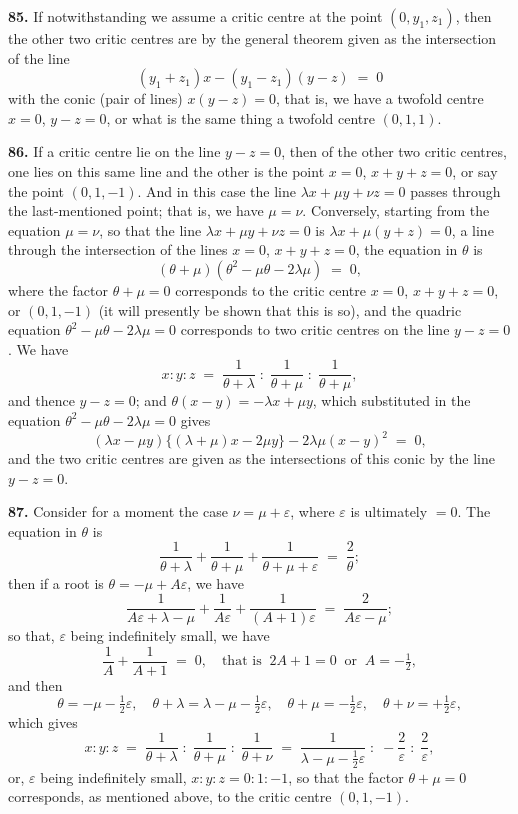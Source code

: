 \documentclass[11pt,a4paper]{article}
\begin{document}
\medskip

\textbf{85.} If notwithstanding we assume a critic centre at the point $(0,y_{1},z_{1})$, then the other two critic centres are by the general theorem given as the intersection of the line
\[
(y_{1}+z_{1})x - (y_{1}-z_{1})(y-z) \;=\; 0
\]
with the conic (pair of lines) $x(y-z) = 0$, that is, we have a twofold centre $x=0$, $y-z=0$, or what is the same thing a twofold centre $(0,1,1)$.

\medskip

\textbf{86.} If a critic centre lie on the line $y-z=0$, then of the other two critic centres, one lies on this same line and the other is the point $x=0$, $x+y+z=0$, or say the point $(0,1,-1)$. And in this case the line $\lambda x + \mu y + \nu z = 0$ passes through the last-mentioned point; that is, we have $\mu = \nu$. Conversely, starting from the equation $\mu = \nu$, so that the line $\lambda x + \mu y + \nu z = 0$ is $\lambda x + \mu(y+z) = 0$, a line through the intersection of the lines $x=0$, $x+y+z=0$, the equation in $\theta$ is
\[
(\theta + \mu)(\theta^{2}-\mu\theta-2\lambda\mu) \;=\; 0,
\]
where the factor $\theta + \mu = 0$ corresponds to the critic centre $x=0$, $x+y+z=0$, or $(0,1,-1)$ (it will presently be shown that this is so), and the quadric equation $\theta^{2}-\mu\theta-2\lambda\mu=0$ corresponds to two critic centres on the line $y-z=0$. We have
\[
x:y:z \;=\; \frac{1}{\theta+\lambda} \;:\; \frac{1}{\theta+\mu} \;:\; \frac{1}{\theta+\mu},
\]
and thence $y-z=0$; and $\theta(x-y) = -\lambda x + \mu y$, which substituted in the equation $\theta^{2}-\mu\theta-2\lambda\mu=0$ gives
\[
(\lambda x - \mu y)\bigl\{(\lambda+\mu)x - 2\mu y\bigr\} - 2\lambda\mu(x-y)^{2} \;=\; 0,
\]
and the two critic centres are given as the intersections of this conic by the line $y-z=0$.

\medskip

\textbf{87.} Consider for a moment the case $\nu = \mu + \varepsilon$, where $\varepsilon$ is ultimately $=0$. The equation in $\theta$ is
\[
\frac{1}{\theta+\lambda} + \frac{1}{\theta+\mu} + \frac{1}{\theta+\mu+\varepsilon} \;=\; \frac{2}{\theta};
\]
then if a root is $\theta = -\mu + A\varepsilon$, we have
\[
\frac{1}{A\varepsilon + \lambda - \mu} + \frac{1}{A\varepsilon} + \frac{1}{(A+1)\varepsilon} \;=\; \frac{2}{A\varepsilon - \mu};
\]
so that, $\varepsilon$ being indefinitely small, we have
\[
\frac{1}{A} + \frac{1}{A+1} \;=\; 0,\quad\text{that is}\;\;2A+1=0\;\;\text{or}\;\;A=-\tfrac{1}{2},
\]
and then
\[
\theta=-\mu-\tfrac{1}{2}\varepsilon,\quad \theta+\lambda=\lambda-\mu-\tfrac{1}{2}\varepsilon,\quad \theta+\mu=-\tfrac{1}{2}\varepsilon,\quad \theta+\nu=+\tfrac{1}{2}\varepsilon,
\]
which gives
\[
x:y:z \;=\; \frac{1}{\theta+\lambda} \;:\; \frac{1}{\theta+\mu} \;:\; \frac{1}{\theta+\nu} \;=\; \frac{1}{\lambda-\mu-\tfrac{1}{2}\varepsilon} \;:\; -\frac{2}{\varepsilon} \;:\; \frac{2}{\varepsilon},
\]
or, $\varepsilon$ being indefinitely small, $x : y : z = 0 : 1 : -1$, so that the factor $\theta + \mu = 0$ corresponds, as mentioned above, to the critic centre $(0,1,-1)$.
\end{document}
